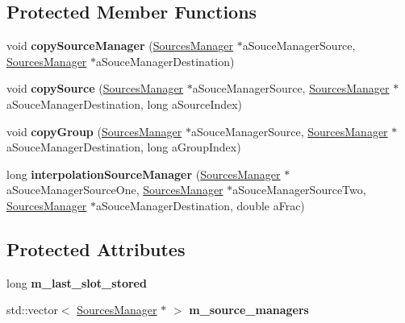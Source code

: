 \subsection*{Protected Member Functions}
\begin{DoxyCompactItemize}
\item 
\hypertarget{class_sources_preset_a1b8192b4128b175ca6515e4561dd831c}{void {\bfseries copy\-Source\-Manager} (\hyperlink{class_sources_manager}{Sources\-Manager} $\ast$a\-Souce\-Manager\-Source, \hyperlink{class_sources_manager}{Sources\-Manager} $\ast$a\-Souce\-Manager\-Destination)}\label{class_sources_preset_a1b8192b4128b175ca6515e4561dd831c}

\item 
\hypertarget{class_sources_preset_a61b009a86b6b664df852e480b2fce602}{void {\bfseries copy\-Source} (\hyperlink{class_sources_manager}{Sources\-Manager} $\ast$a\-Souce\-Manager\-Source, \hyperlink{class_sources_manager}{Sources\-Manager} $\ast$a\-Souce\-Manager\-Destination, long a\-Source\-Index)}\label{class_sources_preset_a61b009a86b6b664df852e480b2fce602}

\item 
\hypertarget{class_sources_preset_aebfe0eb7bef464436b475ab3caff83ef}{void {\bfseries copy\-Group} (\hyperlink{class_sources_manager}{Sources\-Manager} $\ast$a\-Souce\-Manager\-Source, \hyperlink{class_sources_manager}{Sources\-Manager} $\ast$a\-Souce\-Manager\-Destination, long a\-Group\-Index)}\label{class_sources_preset_aebfe0eb7bef464436b475ab3caff83ef}

\item 
\hypertarget{class_sources_preset_ad5b262c5cbd7bf28e02fca4f107d6e2f}{long {\bfseries interpolation\-Source\-Manager} (\hyperlink{class_sources_manager}{Sources\-Manager} $\ast$a\-Souce\-Manager\-Source\-One, \hyperlink{class_sources_manager}{Sources\-Manager} $\ast$a\-Souce\-Manager\-Source\-Two, \hyperlink{class_sources_manager}{Sources\-Manager} $\ast$a\-Souce\-Manager\-Destination, double a\-Frac)}\label{class_sources_preset_ad5b262c5cbd7bf28e02fca4f107d6e2f}

\end{DoxyCompactItemize}
\subsection*{Protected Attributes}
\begin{DoxyCompactItemize}
\item 
\hypertarget{class_sources_preset_acff67a9d23aa4d9d818f791719a190ea}{long {\bfseries m\-\_\-last\-\_\-slot\-\_\-stored}}\label{class_sources_preset_acff67a9d23aa4d9d818f791719a190ea}

\item 
\hypertarget{class_sources_preset_a65def0661bcd9c262bcc3643de782200}{std\-::vector$<$ \hyperlink{class_sources_manager}{Sources\-Manager} $\ast$ $>$ {\bfseries m\-\_\-source\-\_\-managers}}\label{class_sources_preset_a65def0661bcd9c262bcc3643de782200}

\end{DoxyCompactItemize}


